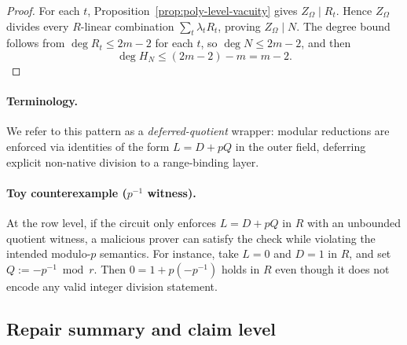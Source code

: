 ﻿\documentclass[11pt]{article}
\begin{document}
\begin{proof}
For each \(t\), Proposition~\ref{prop:poly-level-vacuity} gives \(Z_\Omega\mid R_t\).
Hence \(Z_\Omega\) divides every \(R\)-linear combination \(\sum_t\lambda_tR_t\),
proving \(Z_\Omega\mid N\). The degree bound follows from
\(\deg R_t\le 2m-2\) for each \(t\), so \(\deg N\le 2m-2\), and then
\[
\deg H_N\le (2m-2)-m=m-2.
\]
\end{proof}

\paragraph{Terminology.}
We refer to this pattern as a \emph{deferred-quotient} wrapper: modular
reductions are enforced via identities of the form \(L=D+pQ\) in the outer
field, deferring explicit non-native division to a range-binding layer.

\paragraph{Toy counterexample (\(p^{-1}\) witness).}
At the row level, if the circuit only enforces \(L=D+pQ\) in \(R\) with an
unbounded quotient witness, a malicious prover can satisfy the check while
violating the intended modulo-\(p\) semantics. For instance, take \(L=0\) and
\(D=1\) in \(R\), and set \(Q:=-p^{-1}\bmod r\). Then \(0=1+p(-p^{-1})\) holds in
\(R\) even though it does not encode any valid integer division statement.

\subsection{Repair summary and claim level}
\end{document}
